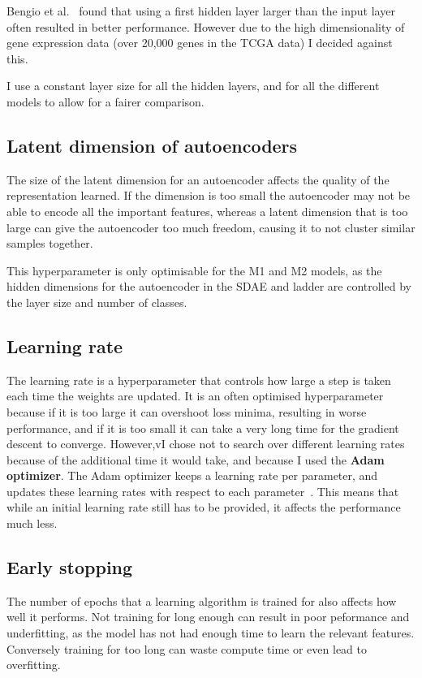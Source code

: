 Bengio et al.~\cite{DBLP:series/lncs/Bengio12} found that using a first hidden layer larger than the input layer often resulted in 
better performance. However due to the high dimensionality of gene expression data (over 20,000 genes in the TCGA data) I decided against 
this. 

I use a constant layer size for all the hidden layers, and for all the different models to allow for a fairer
comparison.

\subsection{Latent dimension of autoencoders}
The size of the latent dimension for an autoencoder affects the quality of the representation learned. If the dimension is too small the 
autoencoder may not be able to encode all the important features, whereas a latent dimension that is too large can give the autoencoder 
too much freedom, causing it to not cluster similar samples together.

This hyperparameter is only optimisable for the M1 and M2 models, as the hidden dimensions for the autoencoder in the SDAE and ladder 
are controlled by the layer size and number of classes.

\subsection{Learning rate}
The learning rate is a hyperparameter that controls how large a step is taken each time the weights are updated. It is an often
optimised hyperparameter because if it is too large it can overshoot loss minima, resulting in worse performance, and if it is too 
small it can take a very long time for the gradient descent to converge. However,vI chose not to search over different learning 
rates because of the additional time it would take, and because I used the \textbf{Adam optimizer}. The Adam optimizer keeps a 
learning rate per parameter, and updates these learning rates with respect to each 
parameter~\cite{DBLP:journals/corr/KingmaB14}. This means that while an initial learning rate still has to be provided, it affects the 
performance much less.

\subsection{Early stopping}
The number of epochs that a learning algorithm is trained for also affects how well it performs. Not training for long enough can result in
poor peformance and underfitting, as the model has not had enough time to learn the relevant features. Conversely training for too long can
waste compute time or even lead to overfitting.

